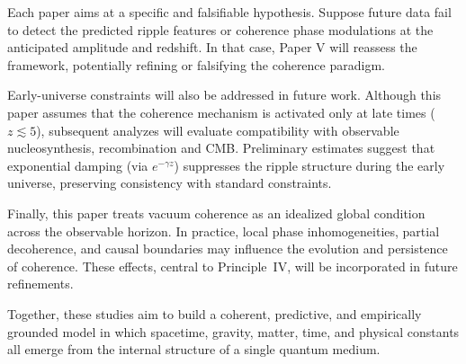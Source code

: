 Each paper aims at a specific and falsifiable hypothesis. Suppose future data fail to detect the predicted ripple features or coherence phase modulations at the anticipated amplitude and redshift. In that case, Paper V will reassess the framework, potentially refining or falsifying the coherence paradigm.

Early-universe constraints will also be addressed in future work. Although this paper assumes that the coherence mechanism is activated only at late times (\( z \lesssim 5 \)), subsequent analyzes will evaluate compatibility with observable nucleosynthesis, recombination and CMB. Preliminary estimates suggest that exponential damping (via \( e^{-\gamma z} \)) suppresses the ripple structure during the early universe, preserving consistency with standard constraints.

Finally, this paper treats vacuum coherence as an idealized global condition across the observable horizon. In practice, local phase inhomogeneities, partial decoherence, and causal boundaries may influence the evolution and persistence of coherence. These effects, central to Principle~IV, will be incorporated in future refinements.

Together, these studies aim to build a coherent, predictive, and empirically grounded model in which spacetime, gravity, matter, time, and physical constants all emerge from the internal structure of a single quantum medium.
